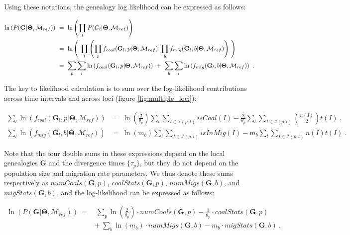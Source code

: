 \documentclass[11pt]{article}
\newcommand{\vect}[1]{\boldsymbol{\mathbf{#1}}}
\newcommand{\M}{\mathcal{M}}
\newcommand{\G}{\vect{G}}
\newcommand{\T}{\vect{\Theta}}
\newcommand{\Ip}{\mathcal{I}(p,l)}
\newcommand{\Ib}{\mathcal{I}(b,l)}
\newcommand{\Mref}{\M_{ref}}
\newcommand{\1}{\mathbbm{1}}
\begin{document}
Using these notations, the genealogy log likelihood can be expressed as follows:
%
%
\begin{small}
\begin{align}
\ln \left( P(\G| \T,\Mref) \right) ~&=~ \ln \left( \prod_{l}  P(G_l| \T,\Mref) \right)  \notag \\ 
%
&=~  \ln \left( ~\prod_{l}  \left( \prod_{p} f_{coal}(\G_l,p|\T,\Mref) ~ \prod_{b} f_{mig}(\G_l,b|\T,\Mref) \right) ~\right) \notag \\ 
%
&=~  \sum_{p}\sum_{l}\ln \left( f_{coal}(\G_l,p|\T,\Mref) \right) ~ + ~ \sum_{b}\sum_{l}\ln \left( f_{mig}(\G_l,b|\T,\Mref) \right)~. 
\label{eqn:ld-details}
\end{align}
\end{small}

The key to likelihood calculation is to sum over the log-likelihood contributions across time intervals and across loci (figure \ref{fig:multiple_loci}):
%
%
\begin{small}
\begin{align}
\sum_{l}\ln \left( f_{coal}(\G_l,p|\T,\Mref) \right) &=~ %
\ln\left( \frac{2}{\theta_p}\right) \sum_{l} \sum_{I \in \Ip} isCoal(I)  - \frac{2}{\theta_p} \sum_{l} \sum_{I \in \Ip}{n(I)\choose 2}t(I) ~.
\label{eqn:ld-coal-stats}\\
\sum_{l}\ln \left( f_{mig}(\G_l,b|\T,\Mref) \right) &=~ %
\ln\left( m_b\right) \sum_{l} \sum_{I \in \Ip} isInMig(I)  - m_b \sum_{l} \sum_{I \in \Ip}n(I) t(I) ~.
\label{eqn:ld-mig-stats}
\end{align}
\end{small}

Note that the four double sums in these expressions depend on the local genealogies $\G$ and the divergence times $\{\tau_p\}$, but they do not depend on the population size and migration rate parameters. We thus denote these sums respectively as $numCoals(\G,p)$, $coalStats(\G,p)$,  $numMigs(\G,b)$, and $migStats(\G,b)$, and the log-likelihood can be expressed as follows:
%
%
\begin{small}
\begin{align}
\ln \left( P(\G| \T,\Mref) \right) ~=&~ \sum_{p}  \ln\left( \frac{2}{\theta_p}\right)\cdot numCoals(\G,p) - \frac{1}{\theta_p}\cdot coalStats(\G,p) \\
& +~ \sum_{b}  \ln\left( m_b\right)\cdot numMigs(\G,b) - m_b \cdot migStats(\G,b) ~. 
\label{eqn:ld-final}
\end{align}
\end{small}
\end{document}
